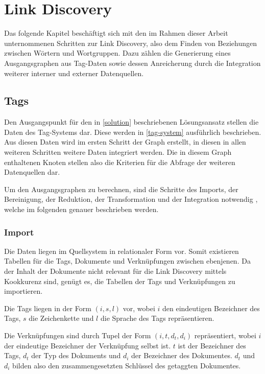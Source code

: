 \chapter{Link Discovery}

Das folgende Kapitel beschäftigt sich mit den im Rahmen dieser Arbeit unternommenen Schritten zur Link Discovery, also dem Finden von Beziehungen zwischen Wörtern und Wortgruppen. Dazu zählen die Generierung eines Ausgangsgraphen aus Tag-Daten sowie dessen Anreicherung durch die Integration weiterer interner und externer Datenquellen.

\section{Tags}

Den Ausgangspunkt für den in \ref{solution} beschriebenen Lösungsansatz stellen die Daten des Tag-Systems dar. Diese werden in \ref{tag-system} ausführlich beschrieben. Aus diesen Daten wird im ersten Schritt der Graph erstellt, in diesen in allen weiteren Schritten weitere Daten integriert werden. Die in diesem Graph enthaltenen Knoten stellen also die Kriterien für die Abfrage der weiteren Datenquellen dar.

Um den Ausgangsgraphen zu berechnen, sind die Schritte des Imports, der Bereinigung, der Reduktion, der Transformation und der Integration notwendig \cite{hkp2012}, welche im folgenden genauer beschrieben werden.

\subsection{Import}

Die Daten liegen im Quellsystem in relationaler Form vor. Somit existieren Tabellen für die Tags, Dokumente und Verknüpfungen zwischen ebenjenen. Da der Inhalt der Dokumente nicht relevant für die Link Discovery mittels Kookkurenz sind, genügt es, die Tabellen der Tags und Verknüpfungen zu importieren.

Die Tags liegen in der Form \((i, s, l)\) vor, wobei \(i\) den eindeutigen Bezeichner des Tags, \(s\) die Zeichenkette und \(l\) die Sprache des Tags repräsentieren.

Die Verknüpfungen sind durch Tupel der Form \((i, t, d_t, d_i)\) repräsentiert, wobei \(i\) der eindeutige Bezeichner der Verknüpfung selbst ist. \(t\) ist der Bezeichner des Tags, \(d_t\) der Typ des Dokuments und \(d_i\) der Bezeichner des Dokumentes. \(d_t\) und \(d_i\) bilden also den zusammengesetzten Schlüssel des getaggten Dokumentes. 
 
